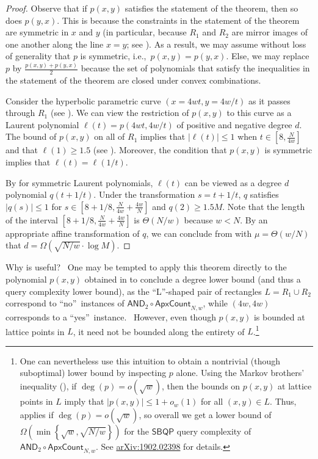 \begin{proof}
Observe that if $p(x, y)$ satisfies the statement of the theorem, then so does $p(y, x)$. This is because the constraints in the statement of the theorem are symmetric in $x$ and $y$ (in particular, because $R_1$ and $R_2$ are mirror images of one another along the line $x = y$; see ). As a result, we may assume without loss of generality that $p$ is symmetric, i.e.,\ $p(x, y) = p(y, x)$. Else, we may replace $p$ by $\frac{p(x, y) + p(y, x)}{2}$ because the set of polynomials that satisfy the inequalities in the statement of the theorem are closed under convex combinations.

Consider the hyperbolic parametric curve $(x = 4wt, y=4w/t)$ as it passes through $R_1$ (see ). We can view the restriction of $p(x, y)$ to this curve as a Laurent polynomial $\ell(t) = p(4wt, 4w/t)$ of positive and negative degree $d$. The bound of $p(x,y)$ on all of $R_1$ implies that $|\ell(t)| \le 1$ when $t \in [8, \frac{N}{4w}]$ and that $\ell(1) \ge 1.5$ (see ). Moreover, the condition that $p(x, y)$ is symmetric implies that $\ell(t) = \ell(1/t)$.

By  for symmetric Laurent polynomials, $\ell(t)$ can be viewed as a degree $d$ polynomial $q(t + 1/t)$. Under the transformation $s = t + 1/t$, $q$ satisfies $|q(s)| \le 1$ for $s \in [8 + 1/8, \frac{N}{4w} + \frac{4w}{N}]$ and $q(2) \ge 1.5 M$. Note that the length of the interval $[8 + 1/8, \frac{N}{4w} + \frac{4w}{N}]$ is $\Theta(N/w)$ because $w < N$. By an appropriate affine transformation of $q$, we can conclude from  with $\mu = \Theta(w/N)$ that $d = \Omega(\sqrt{N/w} \cdot \log M)$.
\end{proof}

Why is  useful? \ One may be tempted to apply this theorem
directly to the polynomial $p(x,y)$ obtained in  to
conclude a degree lower bound (and thus a query complexity lower bound), as
the \textquotedblleft L\textquotedblright -shaped pair of rectangles $
L=R_{1}\cup R_{2}$ correspond to \textquotedblleft no\textquotedblright\
instances of $\mathsf{AND}_{2}\circ \mathsf{ApxCount}_{N,w}$, while $(4w,4w)$
corresponds to a \textquotedblleft yes\textquotedblright\ instance. \
However, even though $p(x,y)$ is bounded at lattice points in $L$, it need
not be bounded along the entirety of $L$.\footnote{
One can nevertheless use this intuition to obtain a nontrivial (though
suboptimal) lower bound by inspecting $p$ alone. Using the Markov brothers'
inequality (\Cref{markovlem}), if $\deg (p)=o(\sqrt{w})$, then the bounds on
$p(x,y)$ at lattice points in $L$ imply that $|p(x,y)|\leq 1+o_{w}(1)$ for
all $(x,y)\in L$. Thus, \Cref{thm:L} applies if $\deg (p)=o(\sqrt{w})$, so
overall we get a lower bound of $\Omega \left( \min \left\{ \sqrt{w},\sqrt{
N/w}\right\} \right) $ for the $\mathsf{SBQP}$ query complexity of $\mathsf{
AND}_{2}\circ \mathsf{ApxCount}_{N,w}$. See 
\href{https://arxiv.org/abs/1902.02398}{arXiv:1902.02398} for details.} \ 

